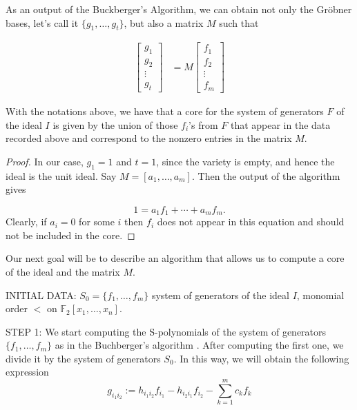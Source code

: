 As an output of the Buckberger's Algorithm, we can obtain not only the Gr\"obner bases, let's call it $\{g_1,\ldots,g_t\}$, but also a matrix $M$ such that
\begin{center}
\begin{align}
   \begin{bmatrix}
           g_{1} \\
           g_{2} \\
           \vdots \\
           g_{t}
         \end{bmatrix}
    &= M \begin{bmatrix}
           f_{1} \\
           f_{2} \\
           \vdots \\
           f_{m}
         \end{bmatrix}
  \end{align}

\end{center}
\begin{thm}
With the notations above, we have that a core for the system of generators $F$ of the ideal $I$ is given by the union of those $f_i$'s from $F$ that appear in the data recorded above and correspond to the nonzero entries in the matrix $M$. 
\end{thm}

\begin{proof}
In our case, $g_1=1$ and $t=1$, since the variety is empty, and hence the ideal is the unit ideal. Say $M= [a_1, \ldots, a_m]$. Then the output of the algorithm gives

$$1 = a_1f_1+\cdots + a_m f_m.$$ Clearly, if $a_i=0$ for some $i$ then $f_i$ does not appear in this equation and should not be included in the core.

\end{proof}


%
%

 Our next goal will be to describe an algorithm that allows us to compute a core of the ideal and the matrix $M$.

INITIAL DATA: $S_0=\{f_1,\ldots,f_m\}$ system of generators of the ideal $I$, monomial order $<$ on $\mathbb{F}_2[x_1,\ldots,x_n]$.

STEP 1: We start computing the S-polynomials of the system of generators $\{f_1,\ldots,f_m\}$ as in the Buchberger's algorithm \cite{HH}. After computing the first one, we divide it by the system of generators $S_0$. In this way, we will obtain the following expression
$$g_{i_1i_2}:= h_{i_1i_2}f_{i_1}-h_{i_2i_1}f_{i_2}-\displaystyle\sum_{k=1}^m c_kf_k$$

